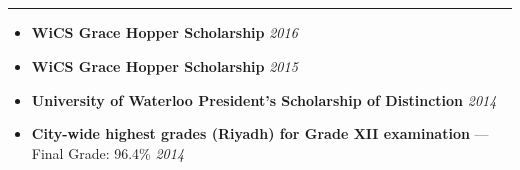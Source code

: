 \documentclass[7pt,letterpaper]{article}
\begin{document}
\subsection*{}
\hrule
\vspace{1.0em}
  \begin{itemize}
    \parskip=-0.5em
  \itemsep0.5em
  \item[]
    \textbf{WiCS Grace Hopper Scholarship} \hfill \emph{2016}
  \item[]
    \textbf{WiCS Grace Hopper Scholarship} \hfill \emph{2015}
    \item[]
      \textbf{University of Waterloo President's Scholarship of Distinction} \hfill \emph{2014}
  \item[]
    \textbf{City-wide highest grades (Riyadh) for Grade XII examination} ---
    Final Grade: 96.4\% \hfill \emph{2014}
    
  \end{itemize}
\end{document}
